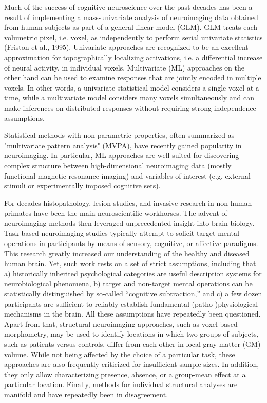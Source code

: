 \documentclass[authoryear,review,3p]{elsarticle}
\begin{document}
Much of the success of cognitive neuroscience over the past decades has been a result of implementing a mass-univariate analysis of neuroimaging data obtained from human subjects as part of a general linear model (GLM). GLM treats each volumetric pixel, i.e. voxel, as independently to perform serial univariate statistics (Friston et al., 1995). 
Univariate approaches are recognized to be an excellent approximation for topographically localizing activations, i.e. a differential increase of neural activity, in individual voxels. Multivariate (ML) approaches on the other hand can be used to examine responses that are jointly encoded in multiple voxels. In other words, a univariate statistical model considers a single voxel at a time, while a multivariate model considers many voxels simultaneously and can make inferences on distributed responses without requiring strong independence assumptions. 

Statistical methods with non-parametric properties, often summarized as "multivariate pattern analysis" (MVPA), have recently gained popularity in neuroimaging. In particular, ML approaches are well suited for discovering complex structure between high-dimensional neuroimaging data (mostly functional magnetic resonance imaging) and variables of interest (e.g. external stimuli or experimentally imposed cognitive sets). 


For decades histopathology, lesion studies, and invasive research in non-human primates have been the main neuroscientific workhorses. The advent of neuroimaging methods then leveraged unprecedented insight into brain biology. Task-based neuroimaging studies typically attempt to solicit target mental operations in participants by means of sensory, cognitive, or affective paradigms. This research greatly increased our understanding of the healthy and diseased human brain. Yet, such work rests on a set of strict assumptions, including that a) historically inherited psychological categories are useful description systems for neurobiological phenomena, b) target and non-target mental operations can be statistically distinguished by so-called “cognitive subtraction,” and c) a few dozen participants are sufficient to reliably establish fundamental (patho-)physiological mechanisms in the brain. All these assumptions have repeatedly been questioned. Apart from that, structural neuroimaging approaches, such as voxel-based morphometry, may be used to identify locations in which two groups of subjects, such as patients versus controls, differ from each other in local gray matter (GM) volume. While not being affected by the choice of a particular task, these approaches are also frequently criticized for insufficient sample sizes. In addition, they only allow characterizing presence, absence, or a group-mean effect at a particular location. Finally, methods for individual structural analyses are manifold and have repeatedly been in disagreement.
\end{document}

